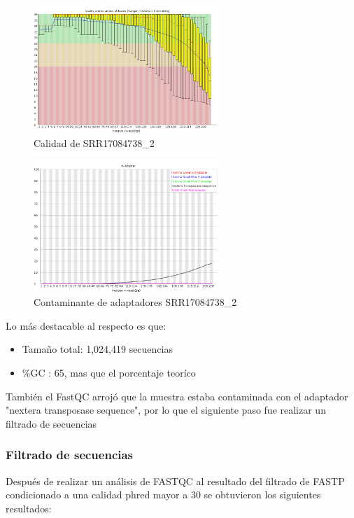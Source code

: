 \documentclass[journal, letterpaper, 11pt]{IEEEtran}
\begin{document}
\begin{figure}[H]
\centering
\includegraphics[width=7cm]{Imagenes/fastqc_2_1.png}
\caption{Calidad de SRR17084738\_2}
\end{figure}
\begin{figure}[H]
\centering
\includegraphics[width=7cm]{Imagenes/fastqc_2_2.png}
\caption{Contaminante de adaptadores SRR17084738\_2}
\end{figure}



Lo más destacable al respecto es que:

\begin{itemize}
\item Tamaño total: 1,024,419 secuencias
\item \%GC : 65, mas que el porcentaje teoríco
\end{itemize}

También el FastQC arrojó que la muestra estaba contaminada con el adaptador "nextera transposase sequence", por lo que el siguiente paso fue realizar un filtrado de secuencias \linebreak


\subsubsection{Filtrado de secuencias}
Después de realizar un análisis de FASTQC al resultado del filtrado de FASTP condicionado a una calidad phred mayor a 30 se obtuvieron los siguientes resultados:
\end{document}

